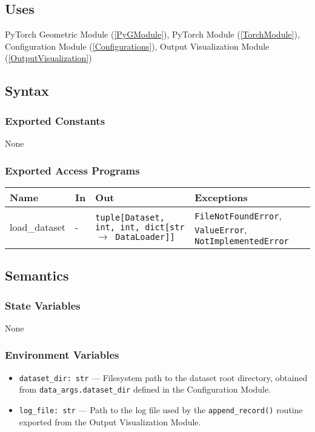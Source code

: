 \documentclass[12pt, titlepage]{article}
\begin{document}
\subsection{Uses}
PyTorch Geometric Module (\ref{PyGModule}), PyTorch Module (\ref{TorchModule}), Configuration Module (\ref{Configurations}), Output Visualization Module (\ref{OutputVisualization})

\subsection{Syntax}

\subsubsection{Exported Constants}
None

\subsubsection{Exported Access Programs}
\begin{center}
\begin{tabular}{p{3cm} p{3cm} p{4.3cm} p{4cm}}
\hline
\textbf{Name} & \textbf{In} & \textbf{Out} & \textbf{Exceptions} \\
\hline
load\_dataset & - & \texttt{tuple[Dataset, int, int, dict[str $\rightarrow$ DataLoader]]} & \texttt{FileNotFoundError}, \texttt{ValueError}, \texttt{NotImplementedError} \\
\hline
\end{tabular}
\end{center}

\subsection{Semantics}

\subsubsection{State Variables}
None

\subsubsection{Environment Variables}
\begin{itemize}
  \item \texttt{dataset\_dir: str} — Filesystem path to the dataset root directory, obtained from \texttt{data\_args.dataset\_dir} defined in the Configuration Module.
  \item \texttt{log\_file: str} — Path to the log file used by the \texttt{append\_record()} routine exported from the Output Visualization Module.
\end{itemize}
\end{document}
